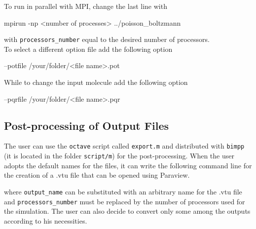 \documentclass[11pt,a4paper]{article}
\begin{document}
To run in parallel with MPI, change the last line with
\begin{code}
mpirun -np <number of processes> ../poisson_boltzmann
\end{code}
with \texttt{processors\_number} equal to the desired number of processors. \\
To select a different option file add the following option
\begin{code}
--potfile /your/folder/<file name>.pot
\end{code}
While to change the input molecule add the following option
\begin{code}
--pqrfile /your/folder/<file name>.pqr
\end{code}

\subsection{Post-processing of Output Files}
The user can use the \texttt{octave} script called \texttt{export.m} and 
distributed with \texttt{bimpp} (it is located in the  folder \texttt{script/m})
for the post-processing. When the user adopts the default names for the files, it 
can write the following command line for the creation of a .vtu file that can be 
opened using Paraview. 


where \texttt{output\_name} can be substituted with an arbitrary name for the .vtu file and \texttt{processors\_number} must be replaced by the number of processors used for the simulation. The user can also decide to convert only some among the outputs according to his necessities. 


\cleardoublepage

\end{document}
